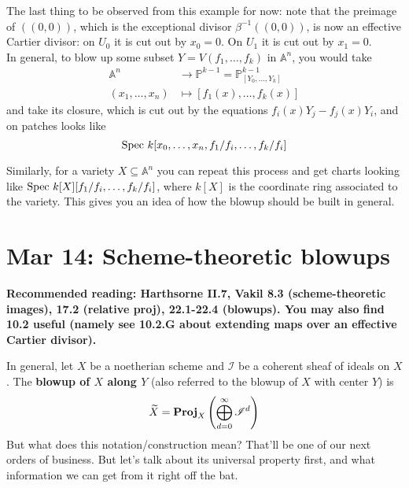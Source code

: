 \documentclass[10pt,reqno]{amsart}
\theoremstyle{definition}
\theoremstyle{remark}
\numberwithin{equation}{section}
\numberwithin{theorem}{section}
\newcommand{\spec}{\textup{Spec }}
\newcommand{\bproj}{\textbf{\textup{Proj}}}
\newcommand{\II}{{\mathscr I}}
\newcommand{\wt}{\widetilde}
\newcommand{\A}{{\mathbb A}}
\newcommand{\PP}{{\mathbb P}}
\begin{document}
The last thing to be observed from this example for now: note that the preimage of $((0,0))$, which is the exceptional divisor $\beta^{-1}((0,0))$, is now an effective Cartier divisor: on $U_0$ it is cut out by $x_0 = 0$. On $U_1$ it is cut out by $x_1 = 0$. 
\\

In general, to blow up some subset $Y = V(f_1,\dots,f_k)$ in $\A^n$, you would take
\begin{align*}
\A^n &\to \PP^{k-1} = \PP^{k-1}_{[Y_0,\dots,Y_k]}\\
(x_1,\dots,x_n)  &\mapsto [f_1(x), \dots, f_k(x)]
\end{align*}
and take its closure, which is cut out by the equations $f_i(x)Y_j - f_j(x)Y_i$, and on patches looks like \[\spec k[x_0,\dots,x_n, f_1/f_i,\dots,f_k/f_i]\]

Similarly, for a variety $X \subseteq \A^n$ you can repeat this process and get charts looking like $\spec k[X][f_1/f_i,\dots,f_k/f_i]$, where $k[X]$ is the coordinate ring associated to the variety. This gives you an idea of how the blowup should be built in general. 
\section{Mar 14: Scheme-theoretic blowups}
\textbf{Recommended reading: Harthsorne II.7,  Vakil 8.3 (scheme-theoretic images), 17.2 (relative proj),  22.1-22.4 (blowups). You may also find 10.2 useful (namely see 10.2.G about extending maps over an effective Cartier divisor).}

In general, let $X$ be a noetherian scheme and $\II$ be a coherent sheaf of ideals on $X$. The \textbf{blowup of $X$ along $Y$} (also referred to the blowup of $X$ with center $Y$) is 
\[\wt{X} = \bproj_X \left(\bigoplus_{d=0}^{\infty} \II^d \right)\]
But what does this notation/construction mean? That'll be one of our next orders of business. But let's talk about its universal property first, and what information we can get from it right off the bat.
\\
\end{document}
